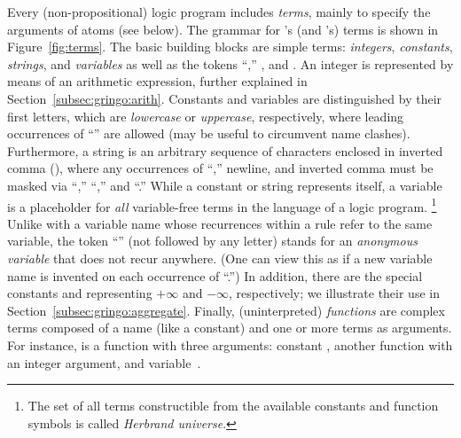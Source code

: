 Every (non-propositional) logic program includes \emph{terms},
mainly to specify the arguments of atoms (see below).
The grammar for \gringo's (and \clingo's) terms is shown in Figure~\ref{fig:terms}.
The basic building blocks are simple terms:
\emph{integers}, \emph{constants}, \emph{strings}, and \emph{variables}
as well as the tokens ``,'' , and .
An integer is represented by means of an arithmetic expression,
further explained in Section~\ref{subsec:gringo:arith}.
Constants and variables are distinguished by their first letters, 
which are \emph{lowercase} or \emph{uppercase}, respectively,
where leading occurrences of ``'' are allowed
(may be useful to circumvent name clashes).
Furthermore, a string is an arbitrary sequence of characters
enclosed in inverted comma (),
where any occurrences of ``\code{\textbackslash},'' newline, and inverted comma
must be masked via ``\code{\textbackslash\textbackslash},'' ``,''
and ``.''
While a constant or string represents itself,
a variable is a placeholder for \emph{all} variable-free terms
in the language of a logic program.%
\footnote{The set of all terms constructible from the available
          constants and function symbols is called \emph{Herbrand universe}.}
Unlike with a variable name whose recurrences within a rule refer to the same variable,
the token ``'' (not followed by any letter)
stands for an \emph{anonymous variable} that does not recur anywhere. 
(One can view this as if a new variable name is invented on each
 occurrence of ``.'')
In addition, there are the special constants  and 
representing $+\infty$ and $-\infty$, respectively;
we illustrate their use in Section~\ref{subsec:gringo:aggregate}.
Finally, (uninterpreted) \emph{functions} are complex terms composed of a name (like a constant)
and one or more terms as arguments. %
For instance, 
is a function with three arguments:
constant , another function 
with an integer argument, and variable~.

